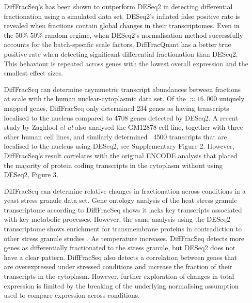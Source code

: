 \documentclass[../main.tex]{subfiles}
\begin{document}
DiffFracSeq's has been shown to outperform DESeq2 in detecting differential fractionation using a simulated data set.
DESeq2's inflated false positive rate is revealed when fractions contain global changes in their transcriptomes.
Even in the 50\%-50\% random regime, when DESeq2's normalisation method successfully accounts for the batch-specific scale factors, DiffFracQuant has a better true positive rate when detecting significant differential fractionation than DESeq2.
This behaviour is repeated across genes with the lowest overall expression and the smallest effect sizes.

DiffFracSeq can determine asymmetric transcript abundances between fractions at scale with the human nuclear-cytoplasmic data set.
Of the $\approx16,000$ uniquely mapped genes, DiffFracSeq only determined 234 genes as having transcripts localised to the nucleus compared to 4708 genes detected by DESeq2.
A recent study by Zaghlool \textit{et al} also analysed the GM12878 cell line, together with three other human cell lines, and similarly determined ~4500 transcripts that are localised to the nucleus using DESeq2, see \parencite{Zaghlool2021} Supplementary Figure 2. 
However, DiffFracSeq's result correlates with the original ENCODE analysis that placed the majority of protein coding transcripts in the cytoplasm without using DESeq2, \parencite{Djebali2012} Figure 3.

DiffFracSeq can determine relative changes in fractionation across conditions in a yeast stress granule data set.
Gene ontology analysis of the heat stress granule transcriptome according to DiffFracSeq shows it lacks key transcripts associated with key metabolic processes.
However, the same analysis using the DESeq2 transcriptome shows enrichment for transmembrane proteins in contradiction to other stress granule studies \parencite{Unworth2010, Khong2017}.
As temperature increases, DiffFracSeq detects more genes as differentially fractionated to the stress granule, but DESeq2 does not have a clear pattern.
DiffFracSeq also detects a correlation between genes that are overexpressed under stressed conditions and increase the fraction of their transcripts in the cytoplasm.
However, further exploration of changes in total expression is limited by the breaking of the underlying normalising assumption used to compare expression across conditions.
\end{document}
